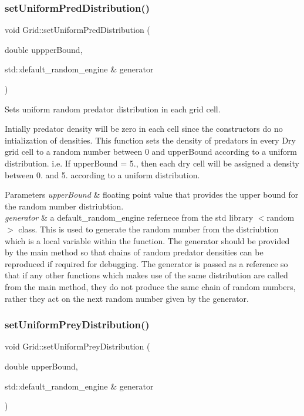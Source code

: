 \subsubsection{\texorpdfstring{set\+Uniform\+Pred\+Distribution()}{setUniformPredDistribution()}}
{\footnotesize\ttfamily void Grid\+::set\+Uniform\+Pred\+Distribution (\begin{DoxyParamCaption}\item[{double}]{uppper\+Bound,  }\item[{std\+::default\+\_\+random\+\_\+engine \&}]{generator }\end{DoxyParamCaption})}



Sets uniform random predator distribution in each grid cell. 

Intially predator density will be zero in each cell since the constructors do no intialization of densities. This function sets the density of predators in every Dry grid cell to a random number between 0 and upper\+Bound according to a uniform distribution. i.\+e. If upper\+Bound = 5., then each dry cell will be assigned a density between 0. and 5. according to a uniform distribution.


\begin{DoxyParams}{Parameters}
{\em upper\+Bound} & floating point value that provides the upper bound for the random number distriubtion.\\
\hline
{\em generator} & a default\+\_\+random\+\_\+engine refernece from the std library $<$random$>$ class. This is used to generate the random number from the distriubtion which is a local variable within the function. The generator should be provided by the main method so that chains of random predator densities can be reproduced if required for debugging. The generator is passed as a reference so that if any other functions which makes use of the same distribution are called from the main method, they do not produce the same chain of random numbers, rather they act on the next random number given by the generator. \\
\hline
\end{DoxyParams}
\mbox{\label{class_grid_a2f366ddaaa75475a9597f9a85ab24d59}} 
\subsubsection{\texorpdfstring{set\+Uniform\+Prey\+Distribution()}{setUniformPreyDistribution()}}
{\footnotesize\ttfamily void Grid\+::set\+Uniform\+Prey\+Distribution (\begin{DoxyParamCaption}\item[{double}]{upper\+Bound,  }\item[{std\+::default\+\_\+random\+\_\+engine \&}]{generator }\end{DoxyParamCaption})}

